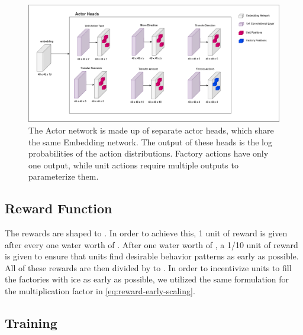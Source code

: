\begin{figure}[htbp]
    \centering
    \includegraphics[width=1\linewidth]{images/methods_hybrid/actor_critic/actor.png}
    \captionsetup{justification=justified, singlelinecheck=false, width=1\linewidth, labelfont=bf} 
    \caption[]{The Actor network is made up of separate actor heads, which share the same Embedding network. The output of these heads is the log probabilities of the action distributions. Factory actions have only one output, while unit actions require multiple outputs to parameterize them.}
    \label{fig:actor}
\end{figure}

\subsection{Reward Function}
\label{subsec:hyb-rew}

\noindent The rewards are shaped to . In order to achieve this, 1 unit of reward is given after every one water worth of . After  one water worth of , a 1/10 unit of reward is given to ensure that units find desirable behavior patterns as early as possible. All of these rewards are then divided by to . In order to incentivize units to fill the factories with ice as early as possible, we utilized the same formulation for the multiplication factor in \autoref{eq:reward-early-scaling}.

\subsection{Training}

